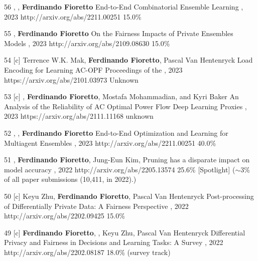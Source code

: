 \begin{pubs}
\confentry
    {56} %
	{, , {\bf Ferdinando Fioretto}}
	{End-to-End Combinatorial Ensemble Learning}
    {\procIJCAI, 2023}
	{http://arxiv.org/abs/2211.00251}
    {15.0\%}

\confentry
    {55} %
	{, {\bf Ferdinando Fioretto}}
	{On the Fairness Impacts of Private Ensembles Models}
    {\procIJCAI, 2023}
	{http://arxiv.org/abs/2109.08630}
    {15.0\%}

\confentry
	{54} %
	{[c] Terrence W.K. Mak, {\bf Ferdinando Fioretto}, Pascal Van Hentenryck}
	{Load Encoding for Learning AC-OPF}
	{Proceedings of the , 2023}
	{https://arxiv.org/abs/2101.03973}
	{Unknown}

\confentry
	{53}
	{[c] , {\bf Ferdinando Fioretto}, Mostafa Mohammadian, and Kyri Baker}
	{An Analysis of the Reliability of AC Optimal Power Flow Deep Learning Proxies}
	{, 2023}
	{https://arxiv.org/abs/2111.11168}
	{unknown}

\confentry
    {52} %
	{, , {\bf Ferdinando Fioretto}}
	{End-to-End Optimization and Learning for Multiagent Ensembles}
    {\procAAMAS, 2023}
	{http://arxiv.org/abs/2211.00251}
    {40.0\%}


\confentryAwd
	{51} %
	{, {\bf Ferdinando Fioretto}, Jung-Eun Kim, }
	{Pruning has a disparate impact on model accuracy}
	{\procNeurIPS, 2022}
	{http://arxiv.org/abs/2205.13574}
	{25.6\%}
	{[Spotlight]}
	{($\sim$3\% of all paper submissions (10,411, in 2022).)}

\confentry
	{50} %
	{[c] Keyu Zhu, {\bf Ferdinando Fioretto}, Pascal Van Hentenryck}
	{Post-processing of Differentially Private Data: A Fairness Perspective}
	{\procIJCAI, 2022}
	{http://arxiv.org/abs/2202.09425}	
	{15.0\%}

\confentry
	{49} %
	{[c] {\bf Ferdinando Fioretto}, , Keyu Zhu, Pascal Van Hentenryck}
	{Differential Privacy and Fairness in Decisions and Learning Tasks: A Survey}
	{\procIJCAI, 2022}
	{http://arxiv.org/abs/2202.08187}	
	{18.0\% (survey track)}


\end{pubs}
